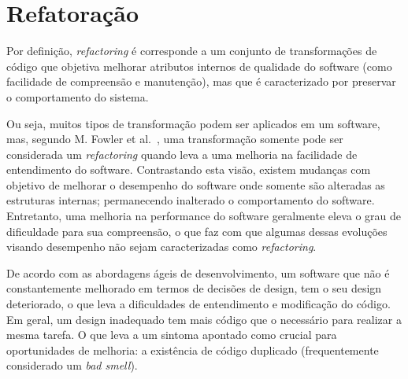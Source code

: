 \section{Refatoração}\label{sec:refactoring}

Por defini\c{c}\~{a}o, \textit{refactoring} \'{e} corresponde a 
um conjunto de transforma\c c\~{o}es  
de c\'{o}digo que objetiva melhorar atributos internos de qualidade  
do software (como facilidade de compreens\~{a}o e 
manuten\c c\~{a}o), mas que \'{e} caracterizado por preservar o comportamento do 
sistema. 

Ou seja, muitos tipos de transforma\c c\~{a}o 
podem ser aplicados em um software, mas, segundo M. Fowler et al.~\cite{martinFowlerRafactoring}, 
uma transforma\c c\~{a}o somente pode ser considerada um \textit{refactoring} quando 
leva a uma melhoria na facilidade de entendimento do software. 
Contrastando esta vis\~{a}o, existem mudan\c{c}as com objetivo de melhorar o desempenho do 
software onde somente s\~{a}o alteradas as estruturas internas; permanecendo inalterado o comportamento do software. 
Entretanto, uma melhoria na performance do software geralmente eleva o grau de dificuldade para sua 
compreens\~{a}o, o que faz com que algumas dessas evolu\c{c}\~{o}es visando desempenho n\~{a}o sejam 
caracterizadas como \textit{refactoring}.


De acordo com as abordagens \'{a}geis de 
desenvolvimento, um software que n\~{a}o \'{e} constantemente melhorado em 
termos de decis\~{o}es de design, tem o seu design deteriorado, 
o que leva a dificuldades de entendimento e modifica\c c\~{a}o do c\'{o}digo. 
Em geral, um design inadequado tem mais c\'{o}digo 
que o necess\'{a}rio para realizar a mesma tarefa. O que leva a um sintoma apontado 
como crucial para oportunidades de melhoria: 
a exist\^{e}ncia de código duplicado (frequentemente considerado um 
\emph{bad smell}). 

